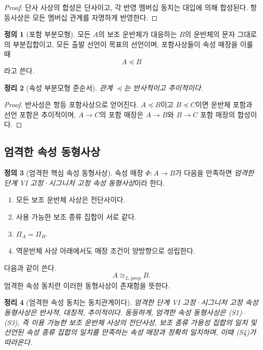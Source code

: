 \documentclass[11pt]{article}
\newtheorem{theorem}{정리}[section]
\theoremstyle{definition}
\newtheorem{definition}[theorem]{정의}
\theoremstyle{remark}
\begin{document}
\begin{proof}
단사 사상의 합성은 단사이고, 각 반영 멤버십 동치는 대입에 의해 합성된다.
항등사상은 모든 멤버십 관계를 자명하게 반영한다.
\end{proof}

\begin{definition}[포함 부분모형]
모든 \(A\)의 보조 운반체가 대응하는 \(B\)의 운반체의 문자 그대로의 부분집합이고, 모든 출발 선언이 목표의 선언이며, 포함사상들이 속성 매장을 이룰 때
\[
A\preccurlyeq B
\]
라고 쓴다.
\end{definition}

\begin{theorem}[속성 부분모형 준순서]
관계 \(\preccurlyeq\)는 반사적이고 추이적이다.
\end{theorem}

\begin{proof}
반사성은 항등 포함사상으로 얻어진다.
\(A\preccurlyeq B\)이고 \(B\preccurlyeq C\)이면 운반체 포함과 선언 포함은 추이적이며, \(A\to C\)의 포함 매장은 \(A\to B\)와 \(B\to C\) 포함 매장의 합성이다.
\end{proof}

\subsection{엄격한 속성 동형사상}

\begin{definition}[엄격한 핵심 속성 동형사상]
\label{def:strict-iso}
속성 매장 \(\Phi:A\to B\)가 다음을 만족하면 \emph{엄격한 단계 VI 고정·시그니처 고정 속성 동형사상}이라 한다.
\begin{enumerate}[label=(S\arabic*)]
\item 모든 보조 운반체 사상은 전단사이다.
\item 사용 가능한 보조 종류 집합이 서로 같다.
\item \(\Pi_A=\Pi_B\).
\item 역운반체 사상 아래에서도 매장 조건이 양방향으로 성립한다.
\end{enumerate}
다음과 같이 쓴다.
\[
A\cong_{L,\mathrm{prop}} B.
\]
엄격한 속성 동치란 이러한 동형사상이 존재함을 뜻한다.
\end{definition}

\begin{theorem}[엄격한 속성 동치는 동치관계이다]
\label{thm:strict-equivalence}
엄격한 단계 VI 고정·시그니처 고정 속성 동형사상은 반사적, 대칭적, 추이적이다.
동등하게, 엄격한 속성 동형사상은 (S1)--(S3), 즉 이용 가능한 보조 운반체 사상의 전단사성, 보조 종류 가용성 집합의 일치 및 선언된 속성 종류 집합의 일치를 만족하는 속성 매장과 정확히 일치하며, 이때 (S4)가 따라온다.
\end{theorem}
\end{document}
